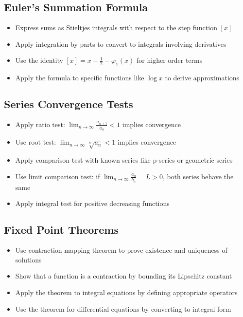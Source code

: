 \subsection*{Euler's Summation Formula}
\begin{itemize}
\item Express sums as Stieltjes integrals with respect to the step function $[x]$
\item Apply integration by parts to convert to integrals involving derivatives
\item Use the identity $[x] = x - \frac{1}{2} - \varphi_1(x)$ for higher order terms
\item Apply the formula to specific functions like $\log x$ to derive approximations
\end{itemize}

\subsection*{Series Convergence Tests}
\begin{itemize}
\item Apply ratio test: $\lim_{n\to\infty} \frac{a_{n+1}}{a_n} < 1$ implies convergence
\item Use root test: $\lim_{n\to\infty} \sqrt[n]{a_n} < 1$ implies convergence
\item Apply comparison test with known series like p-series or geometric series
\item Use limit comparison test: if $\lim_{n\to\infty} \frac{a_n}{b_n} = L > 0$, both series behave the same
\item Apply integral test for positive decreasing functions
\end{itemize}

\subsection*{Fixed Point Theorems}
\begin{itemize}
\item Use contraction mapping theorem to prove existence and uniqueness of solutions
\item Show that a function is a contraction by bounding its Lipschitz constant
\item Apply the theorem to integral equations by defining appropriate operators
\item Use the theorem for differential equations by converting to integral form
\end{itemize}

